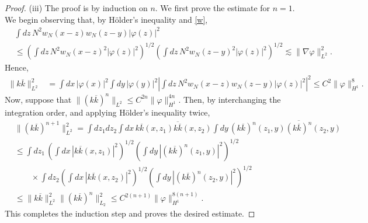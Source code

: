\documentclass[11pt,a4paper]{scrartcl}
\begin{document}
\begin{proof}
  (iii) The proof is by induction on $n$. We first prove the estimate for
  $n=1$. We begin observing that, by H\"older's inequality and \eqref{w},
  \begin{equation}
    \begin{aligned}
      & \int dz \, N^2 w_N(x-z) w_N(z-y) |\varphi(z)|^2 \\
      & \le \left( \int dz \, N^2 w_N(x-z)^2 |\varphi(z)|^2 \right)^{1/2} \left(
      \int dz \, N^2 w_N(z-y)^2 |\varphi(z)|^2 \right)^{1/2} \apprle \| \nabla
      \varphi \|_{L^2}^2.
    \end{aligned}
    \label{ww}
  \end{equation}
  Hence,
  \begin{align*}
    \| k \overline{k} \|_{L^2}^2 & = \int dx \, |\varphi(x)|^2 \int dy \,
    |\varphi(y)|^2 \left| \int dz \, N^2 w_N(x-z) w_N(z-y) |\varphi(z)|^2
    \right|^2 \le C^2 \| \varphi \|_{H^1}^8.
  \end{align*}
  Now, suppose that $\| (k \overline{k})^n \|_{L^2} \le C^{2n} \| \varphi
  \|_{H^1}^{4n}$. Then, by interchanging the integration order, and applying
  H\"older's inequality twice,
  \begin{align*}
    & \| (k \overline{k})^{n+1} \|_{L^2}^2 = \int dz_1 dz_2 \int dx \,
    k\overline{k}(x,z_1) \overline{ k \overline{k}}(x,z_2) \int dy \,
    (k\overline{k})^n(z_1,y) \overline{ (k \overline{k})^n}(z_2,y) \\
    & \le \int dz_1 \, \left( \int dx \, | k\overline{k}(x,z_1)|^2
    \right)^{1/2} \left( \int dy \, | (k\overline{k})^n(z_1,y)|^2
    \right)^{1/2} \\
    & \qquad \times \int dz_2 \left( \int dx \, | k\overline{k}(x,z_2)|^2
    \right)^{1/2} \left( \int dy \, | (k\overline{k})^n(z_2,y)|^2
    \right)^{1/2} \\
    & \le \| k \overline{k} \|_{L^2}^2 \| (k \overline{k})^n \|_{L_2}^2 \le
    C^{2(n+1)} \| \varphi \|_{H^1}^{8(n+1)}.
  \end{align*}
  This completes the induction step and proves the desired estimate.



\end{proof}
\end{document}
